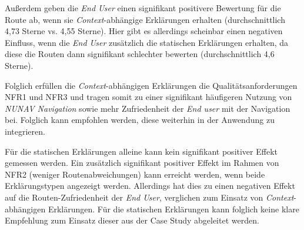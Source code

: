 Außerdem geben die \textit{End User} einen signifikant positivere Bewertung für die Route ab, wenn sie \textit{Context}-abhängige Erklärungen erhalten (durchschnittlich 4,73 Sterne vs. 4,55 Sterne). Hier gibt es allerdings scheinbar einen negativen Einfluss, wenn die \textit{End User} zusätzlich die statischen Erklärungen erhalten, da diese die Routen dann signifikant schlechter bewerten (durchschnittlich 4,6 Sterne).

Folglich erfüllen die \textit{Context}-abhängigen Erklärungen die Qualitätsanforderungen NFR1 und NFR3 und tragen somit zu einer signifikant häufigeren Nutzung von \textit{NUNAV Navigation} sowie mehr Zufriedenheit der \textit{End user} mit der Navigation bei. Folglich kann empfohlen werden, diese weiterhin in der Anwendung zu integrieren.

Für die statischen Erklärungen alleine kann kein signifikant positiver Effekt gemessen werden. Ein zusätzlich signifikant positiver Effekt im Rahmen von NFR2 (weniger Routenabweichungen) kann erreicht werden, wenn beide Erklärungstypen angezeigt werden. Allerdings hat dies zu einen negativen Effekt auf die Routen-Zufriedenheit der \textit{End User}, verglichen zum Einsatz von \textit{Context}-abhängigen Erklärungen. Für die statischen Erklärungen kann folglich keine klare Empfehlung zum Einsatz dieser aus der Case Study abgeleitet werden.

\newpage